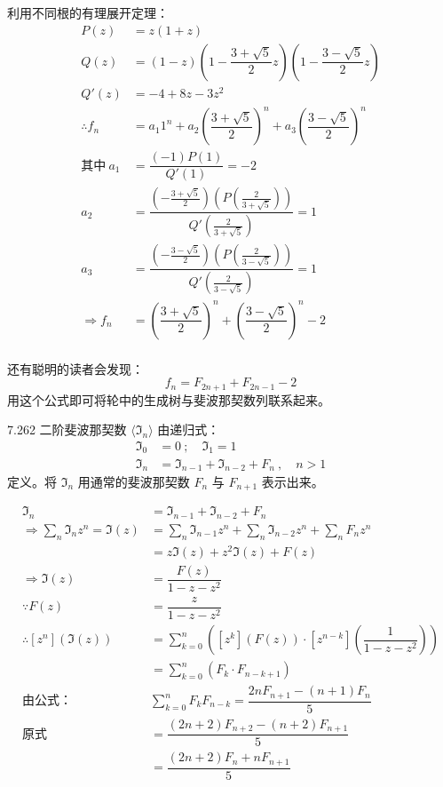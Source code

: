 利用不同根的有理展开定理：
\begin{align*}
  P(z) &= z (1+z) \\
  Q(z) &= (1-z) (1-\dfrac{3+\sqrt{5}}{2}z) (1-\dfrac{3-\sqrt{5}}{2}z) \\
  Q'(z) &= -4 + 8z - 3z^2 \\
  \therefore f_n &= a_1 1^n + a_2 \left( \dfrac{3+\sqrt{5}}{2} \right)^n + a_3 \left( \dfrac{3-\sqrt{5}}{2} \right)^n \\
  \text{其中} \ a_1 &= \dfrac{(-1) P(1)}{Q'(1)} = -2 \\
  a_2 &= \dfrac{(-\frac{3+\sqrt{5}}{2})(P(\frac{2}{3+\sqrt{5}}))}{Q'(\frac{2}{3+\sqrt{5}})} = 1 \\
  a_3 &= \dfrac{(-\frac{3-\sqrt{5}}{2})(P(\frac{2}{3-\sqrt{5}}))}{Q'(\frac{2}{3-\sqrt{5}})} = 1 \\[6pt]
  \Rightarrow f_n &= \left( \dfrac{3+\sqrt{5}}{2} \right)^n + \left( \dfrac{3-\sqrt{5}}{2} \right)^n - 2 \\
\end{align*}

还有聪明的读者会发现：
\[
  f_n = F_{2n+1} + F_{2n-1} - 2
\]
用这个公式即可将轮中的生成树与斐波那契数列联系起来。

\begin{problem}{7.26}{2}
  二阶斐波那契数 \( \langle \Im_n \rangle \) 由递归式：
  \begin{align*}
    \Im_0 &= 0 \ ; \quad \Im_1 = 1 \\
    \Im_n &= \Im_{n-1} + \Im_{n-2} + F_n \ , \quad n > 1
  \end{align*}
  定义。将 \( \Im_n \) 用通常的斐波那契数 \( F_n \) 与 \( F_{n+1} \) 表示出来。
\end{problem}

\begin{align*}
  \Im_n &= \Im_{n-1} + \Im_{n-2} + F_n \\
  \Rightarrow \sum_n \Im_n z^n = \Im (z) &= \sum_n \Im_{n-1} z^n + \sum_n \Im_{n-2} z^n + \sum_n F_n z^n \\
  &= z \Im(z) + z^2 \Im(z) + F(z) \\
  \Rightarrow \Im (z) &= \dfrac{F(z)}{1-z-z^2} \\
  \because F(z) &= \dfrac{z}{1-z-z^2} \\
  \therefore [z^n] (\Im (z)) &= \sum_{k = 0}^n \left( [z^k] (F(z)) \cdot [z^{n-k}] ( \dfrac{1}{1-z-z^2} ) \right) \\
  &= \sum_{k=0}^n (F_k \cdot F_{n-k+1}) \\
  \text{由公式：} \ & \boxed{\sum_{k=0}^n F_k F_{n-k} = \dfrac{2n F_{n+1} - (n+1) F_n}{5}} \\
  \text{原式} \ &= \dfrac{(2n+2) F_{n+2} - (n+2) F_{n+1}}{5} \\
  &= \dfrac{(2n+2)F_n + n F_{n+1}}{5}
\end{align*}

